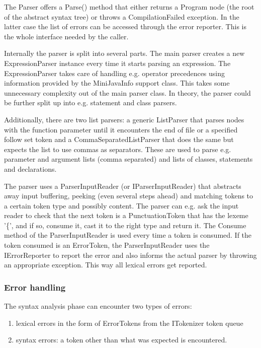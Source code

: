 \documentclass[a4paper,11pt]{article}
\begin{document}
The Parser offers a Parse() method that either returns a Program node (the root of the abstract syntax tree) or throws a CompilationFailed exception. In the latter case the list of errors can be accessed through the error reporter. This is the whole interface needed by the caller.

Internally the parser is split into several parts. The main parser creates a new ExpressionParser instance every time it starts parsing an expression. The ExpressionParser takes care of handling e.g. operator precedences using information provided by the MiniJavaInfo support class. This takes some unnecessary complexity out of the main parser class. In theory, the parser could be further split up into e.g. statement and class parsers.

Additionally, there are two list parsers: a generic ListParser that parses nodes with the function parameter until it encounters the end of file or a specified follow set token and a CommaSeparatedListParser that does the same but expects the list to use commas as separators. These are used to parse e.g. parameter and argument lists (comma separated) and lists of classes, statements and declarations.

The parser uses a ParserInputReader (or IParserInputReader) that abstracts away input buffering, peeking (even several steps ahead) and matching tokens to a certain token type and possibly content. The parser can e.g. ask the input reader to check that the next token is a PunctuationToken that has the lexeme '\{', and if so, consume it, cast it to the right type and return it. The Consume method of the ParserInputReader is used every time a token is consumed. If the token consumed is an ErrorToken, the ParserInputReader uses the IErrorReporter to report the error and also informs the actual parser by throwing an appropriate exception. This way all lexical errors get reported.

\subsubsection{Error handling}

The syntax analysis phase can encounter two types of errors:
\begin{enumerate}
\item lexical errors in the form of ErrorTokens from the ITokenizer token queue
\item syntax errors: a token other than what was expected is encountered.
\end{enumerate}
\end{document}
